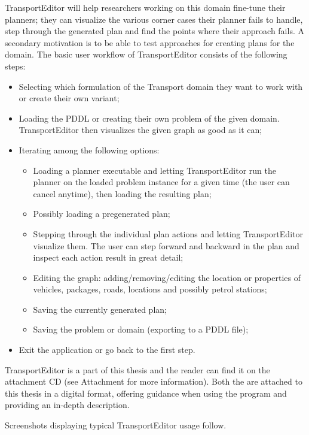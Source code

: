 TransportEditor will help researchers working on this domain fine-tune their planners; they can visualize the various corner cases their planner fails to handle, step through the generated plan and find the points where their approach fails.
A secondary motivation is to be able to test approaches for creating plans for the domain.
The basic user workflow of TransportEditor consists of the following steps:
\begin{itemize}
\item Selecting which formulation of the Transport domain they want to work with or create their own variant;
\item Loading the PDDL or creating their own problem of the given domain. TransportEditor then visualizes the given graph as good as it can;
\item Iterating among the following options:
\begin{itemize}
\item Loading a planner executable and letting TransportEditor run the planner on the loaded problem instance for a given time (the user can cancel anytime),
then loading the resulting plan;
\item Possibly loading a pregenerated plan;
\item Stepping through the individual plan actions and letting TransportEditor visualize them.
The user can step forward and backward in the plan and inspect each action result in great detail;
\item Editing the graph: adding/removing/editing the location or properties of vehicles, packages, roads, locations and possibly petrol stations;
\item Saving the currently generated plan;
\item Saving the problem or domain (exporting to a PDDL file);
\end{itemize}
\item Exit the application or go back to the first step.
\end{itemize}

TransportEditor is a part of this thesis and the reader can find it on the attachment CD (see Attachment  for more information). Both the 
are attached to this thesis in a digital format, offering guidance when
using the program and providing an in-depth description.

Screenshots displaying typical TransportEditor usage follow.

\newpage

